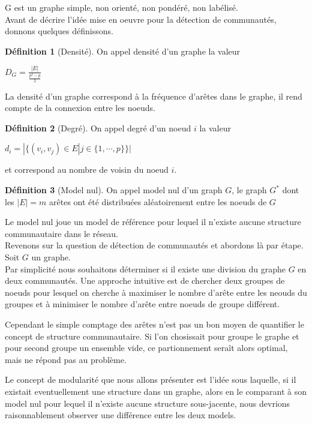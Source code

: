 \documentclass[frenchb]{report}
\newcommand{\1}{\mathbbm{1}}
\theoremstyle{definition}\newtheorem{defn}{Définition}
\theoremstyle{definition}\newtheorem{exm}{Exemple}
\theoremstyle{definition}\newtheorem{nota}{Notation}
\theoremstyle{definition}\newtheorem{rem}{Remarque}
\begin{document}
G est un graphe simple, non orienté, non pondéré, non labélisé.\\

Avant de décrire l'idée mise en oeuvre pour la détection de communautés, donnons quelques définissons.\\

\begin{defn}[Densité]
On appel densité d'un graphe la valeur 
\begin{center}
$D_G = \frac{|E|}{\frac{p^2-p}{2}} $
\end{center}
\end{defn}

La densité d'un graphe correspond à la fréquence d'arêtes dans le graphe, il rend compte de la connexion entre les noeuds.

\begin{defn}[Degré]
On appel degré d'un noeud $i$ la valeur 
\begin{center}
$d_i = |\{(v_i,v_j) \in E | j \in {\{1,\cdots,p\}} \}| $
\end{center}
\end{defn}
et correspond au nombre de voisin du noeud $i$.\\

\begin{defn}[Model nul]
On appel model nul d'un graph $G$, le graph $G^*$ dont les $|E| = m$ arêtes ont été distribuées aléatoirement entre les noeuds de $G$
\end{defn}
Le model nul joue un model de référence pour lequel il n'existe aucune structure communautaire dans le réseau.\\

Revenons sur la question de détection de communautés et abordons là par étape.\\
Soit $G$ un graphe.\\
Par simplicité nous souhaitons déterminer si il existe une division du graphe $G$ en deux communautés. Une approche intuitive est de chercher deux groupes de noeuds pour lesquel on cherche à maximiser le nombre d'arête entre les neouds du groupes et à minimiser le nombre d'arête entre noeuds de groupe différent. 

Cependant le simple comptage des arêtes n'est pas un bon moyen de quantifier le concept de structure communautaire. Si l'on chosissait pour groupe le graphe et pour second groupe un ensemble vide, ce partionnement seraît alors optimal, mais ne répond pas au problème.

Le concept de modularité que nous allons présenter est l'idée sous laquelle, si il existait eventuellement une structure dans un graphe, alors en le comparant à son model nul pour lequel il n'existe aucune structure sous-jacente, nous devrions raisonnablement observer une différence entre les deux models.\\
\end{document}
